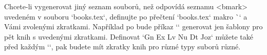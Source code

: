 Chcete-li vygenerovat jiný seznam souborů, než odpovídá seznamu <bmark>
uvedeném v souboru `books.tex`, definujte po přečtení `books.tex`
makro \`\genbooks` a Vámi zvolenými zkratkami. Například po
\begtt
\def\genbooks {Gn Ex Lv Nu Dt Joz}
\endtt
%
bude příkaz `\filegen` generovat jen šablony pro pět knih s uvedenými
zkratkami. Definovat `\genbooks` můžete také před každým `\filegen`, pak
budete mít zkratky knih pro různé typy suborů různé.


%
%
%
%
%
%
%
%
%
%
%
%
